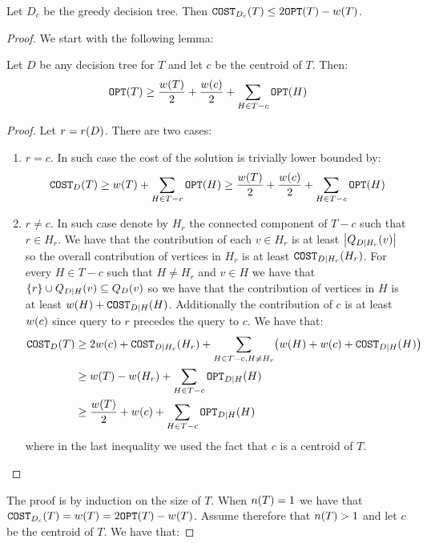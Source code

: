 \begin{theorem}
    Let $D_c$ be the greedy decision tree. Then $\texttt{COST}_{D_c}\mathopen{}\left( T \right)\leq 2\texttt{OPT}\mathopen{}\left( T \right)-w\mathopen{}\left( T \right)$.
    \begin{proof}
        We start with the following lemma:
        \begin{lemma}\label{lemma:avg_lb_centroid}
            Let $D$ be any decision tree for $T$ and let $c$ be the centroid of $T$. Then:
            $$
            \texttt{OPT}\mathopen{}\left( T \right)\geq \frac{w\mathopen{}\left( T \right)}{2}+\frac{w\mathopen{}\left( c \right)}{2}+\sum_{H\in T-c}\texttt{OPT}\mathopen{}\left( H \right)
            $$
            \begin{proof}
                Let $r=r\mathopen{}\left( D \right)$. There are two cases:
                \begin{enumerate}
                    \item $r=c$. In such case the cost of the solution is trivially lower bounded by:
                    $$
                    \texttt{COST}_{D}\mathopen{}\left( T \right)\geq w\mathopen{}\left( T \right)+\sum_{H\in T-r}\texttt{OPT}\mathopen{}\left( H \right)\geq \frac{w\mathopen{}\left( T \right)}{2}+\frac{w\mathopen{}\left( c \right)}{2}+\sum_{H\in T-c}\texttt{OPT}\mathopen{}\left( H \right)
                    $$
                    \item $r\neq c$. In such case denote by $H_r$ the connected component of $T-c$ such that $r\in H_r$. We have that the contribution of each $v\in H_r$ is at least $\mathopen{}\left| Q_{D|H_r}\mathopen{}\left( v \right) \right|$ so the overall contribution of vertices in $H_r$ is at least $\texttt{COST}_{D|H_r}\mathopen{}\left( H_r \right)$. For every $H\in T-c$ such that $H\neq H_r$ and $v\in H$ we have that $\mathopen{}\left\{ r \right\}\cup Q_{D|H}\mathopen{}\left( v \right)\subseteq Q_{D}\mathopen{}\left( v \right)$ so we have that the contribution of vertices in $H$ is at least $w\mathopen{}\left( H \right)+\texttt{COST}_{D|H}\mathopen{}\left( H \right)$. Additionally the contribution of $c$ is at least $w\mathopen{}\left( c \right)$ since query to $r$ precedes the query to $c$. We have that:
                    \begin{align*}
                        \texttt{COST}_D\mathopen{}\left( T \right)&\geq 2w\mathopen{}\left( c \right)+\texttt{COST}_{D|H_r}\mathopen{}\left( H_r \right)+\sum_{H\in T-c, H\neq H_r}\mathopen{}\left( w\mathopen{}\left( H \right)+w\mathopen{}\left( c \right)+\texttt{COST}_{D|H}\mathopen{}\left( H \right) \right)\\
                        &\geq w\mathopen{}\left( T \right)-w\mathopen{}\left( H_r \right)+\sum_{H\in T-c}\texttt{OPT}_{D|H}\mathopen{}\left( H \right)\\
                        &\geq \frac{w\mathopen{}\left( T \right)}{2}+w\mathopen{}\left( c \right)+\sum_{H\in T-c}\texttt{OPT}_{D|H}\mathopen{}\left( H \right)
                    \end{align*}
                    where in the last inequality we used the fact that $c$ is a centroid of $T$.
                \end{enumerate}
            \end{proof}
        \end{lemma}
        The proof is by induction on the size of $T$. When $n\mathopen{}\left( T \right)=1$ we have that $\texttt{COST}_{D_c}\mathopen{}\left( T \right)=w\mathopen{}\left( T \right)=2\texttt{OPT}\mathopen{}\left( T \right)-w\mathopen{}\left( T \right)$. Assume therefore that $n\mathopen{}\left( T \right)>1$ and let $c$ be the centroid of $T$. We have that:

\end{proof}
\end{theorem}
